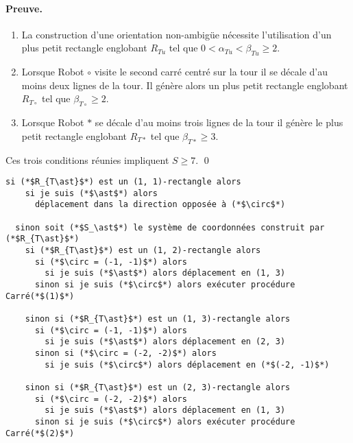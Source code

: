 \documentclass{article}
\begin{document}
      \paragraph{Preuve.}
        \begin{enumerate}
          \item La construction d'une orientation non-ambigüe nécessite
            l'utilisation d'un plus petit rectangle englobant $R_{Tu}$ tel que
            $0 < \alpha_{Tu} < \beta_{Tu} \geq 2$.
            
          \item Lorsque Robot $\circ$ visite le second carré centré sur la tour
            il se décale d'au moins deux lignes de la tour. Il génère alors un
            plus petit rectangle englobant $R_{T\circ}$ tel que $\beta_{T\circ}
            \geq 2$.

          \item Lorsque Robot $\ast$ se décale d'au moins trois lignes de la
            tour il génère le plus petit rectangle englobant $R_{T\ast}$ tel que
            $\beta_{T\ast} \geq 3$.

        \end{enumerate} \medskip

        Ces trois conditions réunies impliquent $S \geq 7$. \qed

\begin{lstlisting}[label=lst:phaseexplo1]
  si (*$R_{T\ast}$*) est un (1, 1)-rectangle alors
    si je suis (*$\ast$*) alors
      déplacement dans la direction opposée à (*$\circ$*)

  sinon soit (*$S_\ast$*) le système de coordonnées construit par (*$R_{T\ast}$*)
    si (*$R_{T\ast}$*) est un (1, 2)-rectangle alors
      si (*$\circ = (-1, -1)$*) alors
        si je suis (*$\ast$*) alors déplacement en (1, 3)
      sinon si je suis (*$\circ$*) alors exécuter procédure Carré(*$(1)$*)

    sinon si (*$R_{T\ast}$*) est un (1, 3)-rectangle alors
      si (*$\circ = (-1, -1)$*) alors
        si je suis (*$\ast$*) alors déplacement en (2, 3)
      sinon si (*$\circ = (-2, -2)$*) alors
        si je suis (*$\circ$*) alors déplacement en (*$(-2, -1)$*)

    sinon si (*$R_{T\ast}$*) est un (2, 3)-rectangle alors
      si (*$\circ = (-2, -2)$*) alors
        si je suis (*$\ast$*) alors déplacement en (1, 3)
      sinon si je suis (*$\circ$*) alors exécuter procédure Carré(*$(2)$*)
\end{lstlisting}
\end{document}
